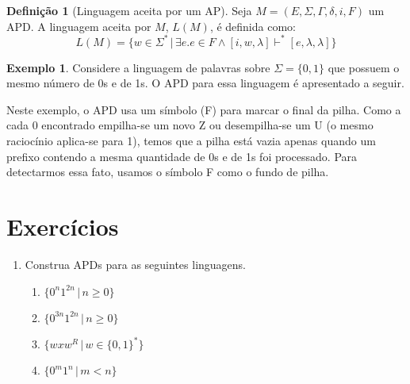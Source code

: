 \documentclass[a4paper]{article}
\theoremstyle{definition}
\newtheorem{Example}{Exemplo}
\newtheorem{Definition}{Definição}
\begin{document}
  \begin{Definition}[Linguagem aceita por um AP]
    Seja $M=(E,\Sigma,\Gamma,\delta,i,F)$ um APD. A linguagem aceita por $M$,
    $L(M)$, é definida como:
    \[
      L(M) = \{w\in\Sigma^*\,|\,\exists e. e \in F \land [i,w,\lambda]\vdash^*[e,\lambda,\lambda]\}
    \]
  \end{Definition}

  \begin{Example}
    Considere a linguagem de palavras sobre $\Sigma=\{0,1\}$ que possuem o mesmo
    número de 0s e de 1s. O APD para essa linguagem é apresentado a seguir.
    \begin{figure}[H]
      \centering
    \end{figure}
    Neste exemplo, o APD usa um símbolo (F) para marcar o final da pilha. Como a
    cada 0 encontrado empilha-se um novo Z ou desempilha-se um U (o mesmo
    raciocínio aplica-se para 1), temos que a pilha está vazia apenas quando um
    prefixo contendo a mesma quantidade de 0s e de 1s foi processado. Para
    detectarmos essa fato, usamos o símbolo F como o fundo de pilha.
  \end{Example}

  \section{Exercícios}

  \begin{enumerate}
     \item Construa APDs para as seguintes linguagens.
       \begin{enumerate}
       \item $\{0^n1^{2n}\,|\,n\geq 0\}$
       \item $\{0^{3n}1^{2n}\,|\,n\geq 0\}$
       \item $\{wxw^R\,|\,w\in\{0,1\}^*\}$
       \item $\{0^m1^n\,|\,m < n\}$
       \end{enumerate}
  \end{enumerate}
\end{document}
